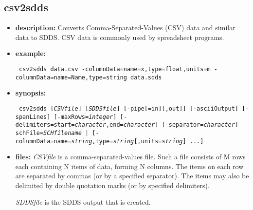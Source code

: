 %
%
%
%
\begin{latexonly}
\newpage
\end{latexonly}
\subsection{csv2sdds}
\label{csv2sdds}

\begin{itemize}
\item {\bf description:} Converts Comma-Separated-Values (CSV) data and similar data to SDDS. CSV data
is commonly used by spreadsheet programs.
\item {\bf example:} 
\begin{flushleft}{\tt
csv2sdds data.csv -columnData=name=x,type=float,units=m -columnData=name=Name,type=string data.sdds
}\end{flushleft}
\item {\bf synopsis:}
\begin{flushleft}{\tt
csv2sdds [{\em CSVfile}] [{\em SDDSfile}] [-pipe[=in][,out]] 
[-asciiOutput] [-spanLines] [-maxRows={\em integer}]
[-delimiters=start={\em character},end={\em character}] 
[-separator={\em character}] 
{-schFile={\em SCHfilename} | [-columnData=name={\em string},type={\em string}[,units={\em string}] ...]}
}\end{flushleft}
\item {\bf files: }
{\em CSVfile} is a comma-separated-values file.  Such a file consists of M rows each containing
N items of data, forming N columns.  The items on each row are separated by commas (or by a 
specified separator).  The items may also be delimited by double quotation marks (or by specified
delimiters).

{\em SDDSfile} is the SDDS output that is created.


\end{itemize}
